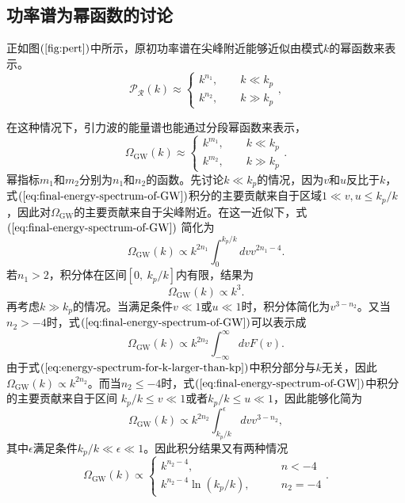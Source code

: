 \subsection{功率谱为幂函数的讨论}
正如图$(\ref{fig:pert})$中所示，原初功率谱在尖峰附近能够近似由模式$k$的幂函数来表示。
\begin{equation}
  \mathcal{P}_{\mathcal{R}}(k) \approx
  \begin{cases}
    k^{n_1},  \qquad k \ll k_{p} \\
    k^{n_2}, \qquad k \gg k_{p}
  \end{cases},
\end{equation}

在这种情况下，引力波的能量谱也能通过分段幂函数来表示，
\begin{equation}
  \Omega_{\text{GW}}(k) \approx
  \begin{cases}
    k^{m_1}, \qquad k \ll k_{p} \\
    k^{m_2}, \qquad k\gg k_{p}
  \end{cases}.
\end{equation}
幂指标$m_1$和$m_2$分别为$n_1$和$n_2$的函数。先讨论$k\ll
k_{p}$的情况，因为$v$和$u$反比于$k$，式$(\ref{eq:final-energy-spectrum-of-GW})$积分的主要贡献来自于区域$1\ll
v,u\le k_{p}
/k$，因此对$\Omega_{\text{GW}}$的主要贡献来自于尖峰附近。在这一近似下，式$(\ref{eq:final-energy-spectrum-of-GW})$
简化为
\begin{equation}
  \Omega_{\text{GW}}(k) \propto k^{2n_1} \int_{0}^{k_{p} /k} dv v^{2n_1-4}.
\end{equation}
若$n_1 > 2$，积分体在区间$ \left[ 0,\ k_{p}/k \right]$内有限，结果为
\begin{equation}
  \Omega_{\text{GW}}(k) \propto k^3. 
\end{equation}
再考虑$k\gg k_{p}$的情况。当满足条件$v\ll 1$或$u\ll
1$时，积分体简化为$v^{3-n_2}$。又当$n_2 >
-4$时，式$(\ref{eq:final-energy-spectrum-of-GW})$可以表示成
\begin{equation}
  \label{eq:energy-spectrum-for-k-larger-than-kp}
  \Omega_{\text{GW}}(k) \propto k^{2n_2} \int_{-\infty}^{\infty} dv F(v).  
\end{equation}
由于式$(\ref{eq:energy-spectrum-for-k-larger-than-kp})$中积分部分与$k$无关，因此$\Omega_{\text{GW}}(k)
\propto k^{2n_2}$。而当$n_2\le
-4$时，式$(\ref{eq:final-energy-spectrum-of-GW})$中积分的主要贡献来自于区间
$k_{p}/k \le v\ll 1$或者$k_{p}/k \le u\ll 1$，因此能够化简为
\begin{equation}
  \Omega_{\text{GW}}(k) \propto k^{2n_2} \int_{k_{p}/k}^{\epsilon} dv
  v^{3-n_2},   
\end{equation}
其中$\epsilon$满足条件$k_{p}/k\ll \epsilon\ll 1$。因此积分结果又有两种情况
\begin{equation}
  \Omega_{\text{GW}}(k) \propto
  \begin{cases}
    k^{n_2-4} , \qquad & n < -4 \\
    k^{n_2-4}\ln (k_{p}/k), \qquad & n_2= -4
  \end{cases}.
\end{equation}

